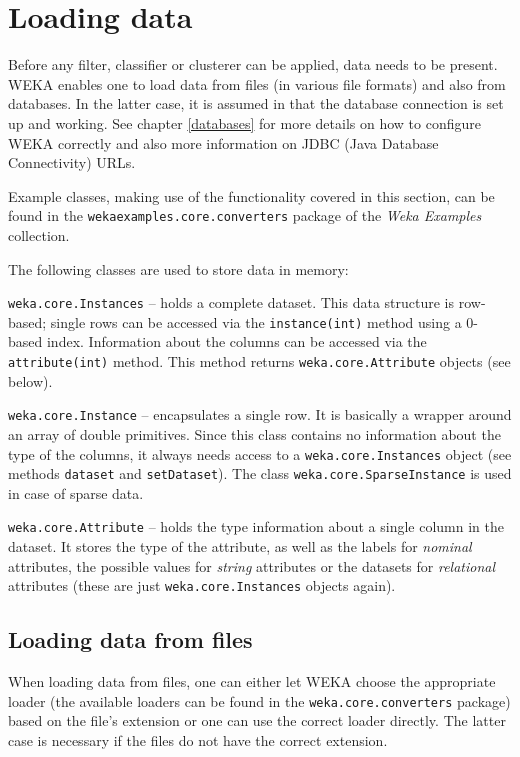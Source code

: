 \newpage

\section{Loading data}
\label{api_loading_data}
Before any filter, classifier or clusterer can be applied, data needs to be
present. WEKA enables one to load data from files (in various file formats) and
also from databases. In the latter case, it is assumed in that the database
connection is set up and working. See chapter \ref{databases} for more details
on how to configure WEKA correctly and also more information on JDBC (Java
Database Connectivity) URLs.

Example classes, making use of the functionality covered in this section, can be
found in the \texttt{wekaexamples.core.converters} package of the \textit{Weka
Examples} collection\cite{wekaexamples}.

The following classes are used to store data in memory:
\begin{tight_itemize}
	\item \texttt{weka.core.Instances} -- holds a complete dataset. This data
structure is row-based; single rows can be accessed via the
\texttt{instance(int)} method using a 0-based index. Information about the
columns can be accessed via the \texttt{attribute(int)} method. This method
returns \texttt{weka.core.Attribute} objects (see below).
	\item \texttt{weka.core.Instance} -- encapsulates a single row. It is
basically a wrapper around an array of double primitives. Since this class
contains no information about the type of the columns, it always needs access
to a \texttt{weka.core.Instances} object (see methods \texttt{dataset} and
\texttt{setDataset}). The class \texttt{weka.core.SparseInstance} is used in
case of sparse data.
	\item \texttt{weka.core.Attribute} -- holds the type information about a
single column in the dataset. It stores the type of the attribute, as well as
the labels for \textit{nominal} attributes, the possible values for
\textit{string} attributes or the datasets for \textit{relational} attributes
(these are just \texttt{weka.core.Instances} objects again).
\end{tight_itemize}

\subsection{Loading data from files}
When loading data from files, one can either let WEKA choose the appropriate
loader (the available loaders can be found in the \texttt{weka.core.converters}
package) based on the file's extension or one can use the correct loader
directly. The latter case is necessary if the files do not have the correct
extension.

